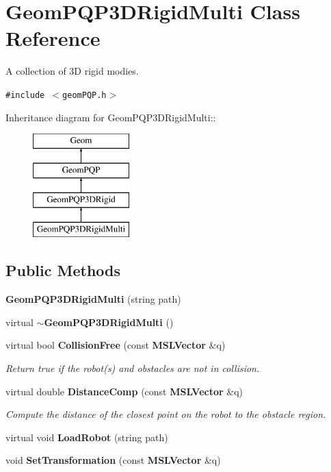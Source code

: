\section{Geom\-PQP3DRigid\-Multi  Class Reference}
\label{class_GeomPQP3DRigidMulti}
A collection of 3D rigid modies. 


{\tt \#include $<$geom\-PQP.h$>$}

Inheritance diagram for Geom\-PQP3DRigid\-Multi::\begin{figure}[H]
\begin{center}
\leavevmode
\includegraphics[height=4cm]{class_GeomPQP3DRigidMulti}
\end{center}
\end{figure}
\subsection*{Public Methods}
\begin{CompactItemize}
\item 
{\bf Geom\-PQP3DRigid\-Multi} (string path)
\item 
virtual {\bf $\sim$Geom\-PQP3DRigid\-Multi} ()
\item 
virtual bool {\bf Collision\-Free} (const {\bf MSLVector} \&q)
\begin{CompactList}\small\item\em Return true if the robot(s) and obstacles are not in collision.\item\end{CompactList}\item 
virtual double {\bf Distance\-Comp} (const {\bf MSLVector} \&q)
\begin{CompactList}\small\item\em Compute the distance of the closest point on the robot to the obstacle region.\item\end{CompactList}\item 
virtual void {\bf Load\-Robot} (string path)
\item 
void {\bf Set\-Transformation} (const {\bf MSLVector} \&q)
\end{CompactItemize}

